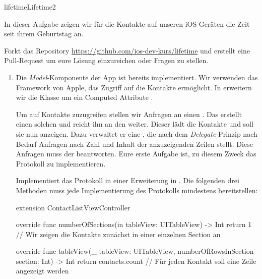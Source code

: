 \documentclass[parskip=half, final]{scrreprt}
\begin{document}
\begin{lecture}


\begin{exc}

\begin{excitem}{lifetime}{Lifetime}{2}

In dieser Aufgabe zeigen wir für die Kontakte auf unseren iOS Geräten die Zeit seit ihrem Geburtstag an.

Forkt das Repository \url{https://github.com/ios-dev-kurs/lifetime} und erstellt eine Pull-Request um eure Lösung einzureichen oder Fragen zu stellen.


\begin{enumerate}

\item Die \emph{Model}-Komponente \mvcindicatormodel der App ist bereits implementiert. Wir verwenden das  Framework von Apple, das Zugriff auf die Kontakte ermöglicht. In  erweitern wir die Klasse  um ein Computed Attribute .

\mvcindicatorcontroller Um auf Kontakte zuzugreifen stellen wir Anfragen an einen . Das  erstellt einen solchen und reicht ihn an den  weiter. Dieser lädt die Kontakte und soll sie nun anzeigen. Dazu verwaltet er eine , die nach dem \emph{Delegate}-Prinzip nach Bedarf Anfragen nach Zahl und Inhalt der anzuzeigenden Zeilen stellt. Diese Anfragen muss der  beantworten. Eure erste Aufgabe ist, zu diesem Zweck das  Protokoll zu implementieren.

Implementiert das Protokoll in einer Erweiterung in . Die folgenden drei Methoden muss jede Implementierung des Protokolls mindestens bereitstellen:

\begin{swiftcode}
extension ContactListViewController {

    override func numberOfSections(in tableView: UITableView) -> Int {
        return 1 // Wir zeigen die Kontakte zunächst in einer einzelnen Section an
    }

    override func tableView(_ tableView: UITableView, numberOfRowsInSection section: Int) -> Int {
        return contacts.count // Für jeden Kontakt soll eine Zeile angezeigt werden
    }

}
\end{swiftcode}
\end{enumerate}
\end{excitem}
\end{exc}
\end{lecture}
\end{document}
